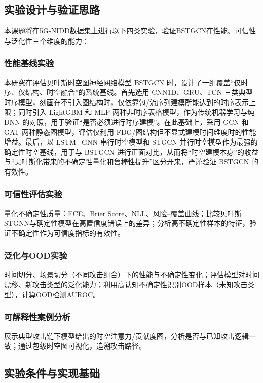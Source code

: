 \subsection{实验设计与验证思路}

本课题将在5G-NIDD数据集上进行以下四类实验，验证BSTGCN在性能、可信性与泛化性三个维度的能力：

\subsubsection{性能基线实验}

本研究在评估贝叶斯时空图神经网络模型 BSTGCN 时，设计了一组覆盖“仅时序、仅结构、时空融合”的系统基线。首先选用 CNN1D、GRU、TCN 三类典型时序模型，刻画在不引入图结构时，仅依靠包/流序列建模所能达到的时序表示上限；同时引入 LightGBM 和 MLP 两种非时序表格模型，作为传统机器学习与纯 DNN 的对照，用于验证“是否必须进行时序建模”。在此基础上，采用 GCN 和 GAT 两种静态图模型，评估仅利用 FDG/图结构但不显式建模时间维度时的性能增益。最后，以 LSTM+GNN 串行时空模型和 STGCN 并行时空模型作为最强的确定性时空基线，用于与 BSTGCN 进行正面对比，从而将“时空建模本身”的收益与“贝叶斯化带来的不确定性量化和鲁棒性提升”区分开来，严谨验证 BSTGCN 的有效性。

\subsubsection{可信性评估实验}

量化不确定性质量：ECE、Brier Score、NLL、风险–覆盖曲线；比较贝叶斯STGNN与确定性模型在高置信度错误上的差异；分析高不确定性样本的特征，验证不确定性作为可信度指标的有效性。

\subsubsection{泛化与OOD实验}

时间切分、场景切分（不同攻击组合）下的性能与不确定性变化；评估模型对时间漂移、新攻击类型的泛化能力；利用高认知不确定性识别OOD样本（未知攻击类型），计算OOD检测AUROC。

\subsubsection{可解释性案例分析}

展示典型攻击链下模型给出的时空注意力/贡献度图，分析是否与已知攻击逻辑一致；通过包级时空图可视化，追溯攻击路径。


\subsection{实验条件与实现基础}

